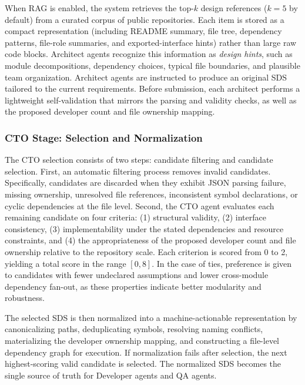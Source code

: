 \documentclass[format=acmsmall, review=false, screen=true]{acmart}
\begin{document}
When RAG is enabled, the system retrieves the top-$k$ design references ($k{=}5$ by default) from a curated corpus of public repositories. Each item is stored as a compact representation (including README summary, file tree, dependency patterns, file-role summaries, and exported-interface hints) rather than large raw code blocks. Architect agents recognize this information as \emph{design hints}, such as module decompositions, dependency choices, typical file boundaries, and plausible team organization. Architect agents are instructed to produce an original SDS tailored to the current requirements. Before submission, each architect performs a lightweight self-validation that mirrors the parsing and validity checks, as well as the proposed developer count and file ownership mapping.

\subsubsection{CTO Stage: Selection and Normalization}
The CTO selection consists of two steps: candidate filtering and candidate selection. First, an automatic filtering process removes invalid candidates. Specifically, candidates are discarded when they exhibit JSON parsing failure, missing ownership, unresolved file references, inconsistent symbol declarations, or cyclic dependencies at the file level. Second, the CTO agent evaluates each remaining candidate on four criteria: (1) structural validity, (2) interface consistency, (3) implementability under the stated dependencies and resource constraints, and (4) the appropriateness of the proposed developer count and file ownership relative to the repository scale. Each criterion is scored from 0 to 2, yielding a total score in the range $[0,8]$. In the case of ties, preference is given to candidates with fewer undeclared assumptions and lower cross-module dependency fan-out, as these properties indicate better modularity and robustness.

The selected SDS is then normalized into a machine-actionable representation by canonicalizing paths, deduplicating symbols, resolving naming conflicts, materializing the developer ownership mapping, and constructing a file-level dependency graph for execution. If normalization fails after selection, the next highest-scoring valid candidate is selected. The normalized SDS becomes the single source of truth for Developer agents and QA agents.
\end{document}
